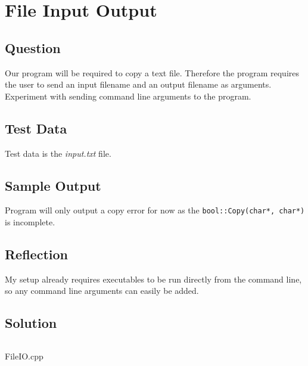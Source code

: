 \documentclass[Lab-C.tex]{subfiles}
\begin{document}
    \section{File Input Output}
        \subsection{Question}
            Our program will be required to copy a text file. Therefore the program requires the user to send an input filename and an output filename as arguments.
            Experiment with sending command line arguments to the program.
            
        \subsection{Test Data}
            Test data is the \textit{input.txt} file.
        
        \subsection{Sample Output}
            Program will only output a copy error for now as the \texttt{bool::Copy(char*, char*)}
            is incomplete.

        \subsection{Reflection}
            My setup already requires executables to be run directly from the command line,
            so any command line arguments can easily be added.
        
        \subsection{Solution}
            \begin{listing}[H]
                \inputminted[firstline=5]{cpp}{../Tasks/01-FileIO/FileIO.cpp}%
                \caption{FileIO.cpp}
            \end{listing}
\end{document}
